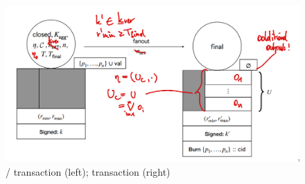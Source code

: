 \begin{figure}

  \centering


  \includegraphics[width=\textwidth/2]{figures/SM_closed_final.png}

  \caption{\mtxClose{}/\mtxContest{} transaction (left);
    \mtxFanout{} transaction (right)}\label{fig:SM_closed_final}

\end{figure}


